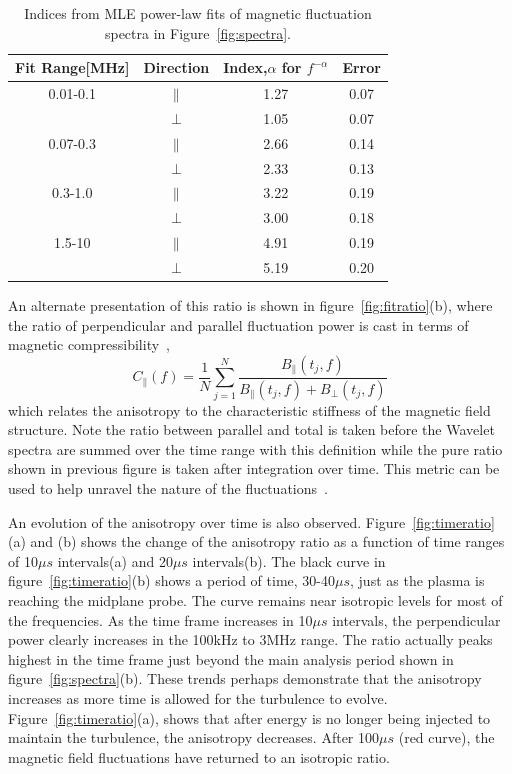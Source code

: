 \documentclass[aip,prl,amsmath,amssymb,reprint,superscriptaddress]{revtex4-1} %
\begin{document}
\begin{table}
\caption{\label{tab:Bindices}Indices from MLE power-law fits of magnetic fluctuation spectra in Figure~\ref{fig:spectra}.}
\begin{tabular}{cccc}
\toprule
Fit Range[MHz]	&	Direction		&	Index,$\alpha$ for $f^{-\alpha}$	&Error\\
\hline
0.01-0.1				& $\parallel$	& 1.27															&0.07\\
								& $\perp$			& 1.05  														&0.07\\
\hline
0.07-0.3				& $\parallel$	& 2.66															&0.14\\
								& $\perp$			& 2.33  														&0.13\\
\hline
0.3-1.0					& $\parallel$	& 3.22															&0.19\\
								& $\perp$			& 3.00  														&0.18\\
\hline
1.5-10					& $\parallel$	& 4.91															&0.19\\
								& $\perp$			& 5.19  														&0.20\\
\hline
\end{tabular}
\end{table}

An alternate presentation of this ratio is shown in figure~\ref{fig:fitratio}(b), where the ratio of perpendicular and parallel fluctuation power is cast in terms of magnetic compressibility~\cite{kiyani13},
\begin{equation}
C_{\parallel}(f) = \frac{1}{N}\sum^{N}_{j=1}\frac{B_{\parallel}(t_{j},f)}{B_{\parallel}(t_{j},f)+B_{\perp}(t_{j},f)}
\label{eq:magcompress}
\end{equation}
which relates the anisotropy to the characteristic stiffness of the magnetic field structure. Note the ratio between parallel and total is taken before the Wavelet spectra are summed over the time range with this definition while the pure ratio shown in previous figure is taken after integration over time. This metric can be used to help unravel the nature of the fluctuations~\cite{tenbarge12,kiyani13}.

An evolution of the anisotropy over time is also observed. Figure~\ref{fig:timeratio}(a) and (b) shows the change of the anisotropy ratio as a function of time ranges of 10$\mu s$ intervals(a) and 20$\mu s$ intervals(b). The black curve in figure~\ref{fig:timeratio}(b) shows a period of time, 30-40$\mu s$, just as the plasma is reaching the midplane probe. The curve remains near isotropic levels for most of the frequencies. As the time frame increases in 10$\mu s$ intervals, the perpendicular power clearly increases in the 100kHz to 3MHz range. The ratio actually peaks highest in the time frame just beyond the main analysis period shown in figure~\ref{fig:spectra}(b). These trends perhaps demonstrate that the anisotropy increases as more time is allowed for the turbulence to evolve. Figure~\ref{fig:timeratio}(a), shows that after energy is no longer being injected to maintain the turbulence, the anisotropy decreases. After 100$\mu s$ (red curve), the magnetic field fluctuations have returned to an isotropic ratio.
\end{document}

